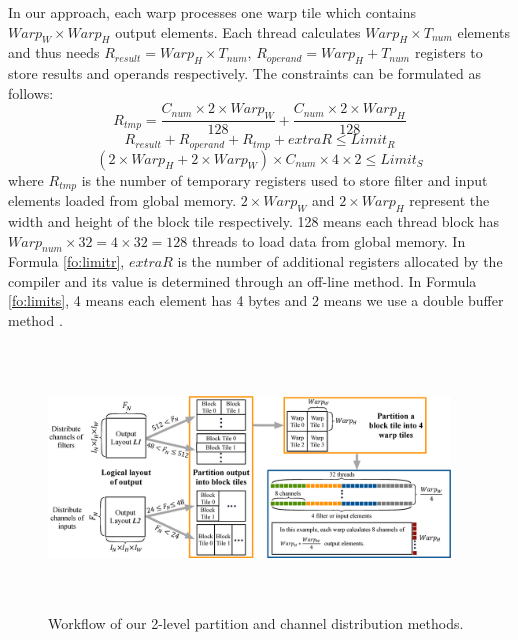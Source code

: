 In our approach, each warp processes one warp tile which contains $Warp_W \times Warp_H$ output elements.
Each thread calculates $Warp_H \times T_{num}$ elements and thus needs $R_{result}=Warp_H \times T_{num}$, $R_{operand}=Warp_H+T_{num}$ registers to store results and operands respectively.
The constraints can be formulated as follows:
\begin{equation}\nonumber
R_{tmp}=\frac{C_{num} \times 2 \times Warp_W}{128}+\frac{C_{num}  \times 2 \times Warp_H}{128}
\end{equation}
\begin{equation}
    \label{fo:limitr}
R_{result}+R_{operand}+R_{tmp}+extraR \leq Limit_R
\end{equation}
\begin{equation}
    \label{fo:limits}
(2 \times Warp_H+2 \times Warp_W)\times C_{num} \times 4 \times 2 \leq Limit_S
\end{equation}
where $R_{tmp}$ is the number of temporary registers used to store filter and input elements loaded from global memory. $2 \times Warp_W$
and $2 \times Warp_H$ represent the width and height of the block tile respectively. 128 means each thread block has $Warp_{num} \times 32
= 4 \times 32=128$ threads to load data from global memory. In Formula \ref{fo:limitr}, $extraR$ is the number of additional registers
allocated by the compiler and its value is determined through an off-line method.  In Formula \ref{fo:limits}, 4 means each element has
4 bytes and 2 means we use a double buffer method \cite{abdelfattah2019fast,nichols2019magmadnn}.
\begin{figure}
	\centering
    \includegraphics[width=0.95\textwidth,height=7cm]{./figure/pwworkflow.eps}
    \vspace{-3mm}
    \caption{Workflow of our 2-level partition and channel distribution methods.} \label{fig:pwworkflow}
\end{figure}
